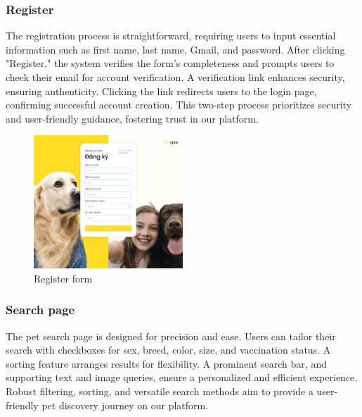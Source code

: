 \subsubsection{Register}

The registration process is straightforward, requiring users to input essential information such as first name, last name, Gmail, and password. After clicking "Register," the system verifies the form's completeness and prompts users to check their email for account verification. A verification link enhances security, ensuring authenticity. Clicking the link redirects users to the login page, confirming successful account creation. This two-step process prioritizes security and user-friendly guidance, fostering trust in our platform.

\begin{figure}[H]
    \centering
    \includegraphics[width=0.5\textwidth]{Figures/UI/register_ui.png}
    \caption{Register form}
\end{figure}

\subsubsection{Search page}

The pet search page is designed for precision and ease. Users can tailor their search 
with checkboxes for sex, breed, color, size, and vaccination status. A sorting feature 
arranges results for flexibility. A prominent search bar, and supporting text and image
 queries, ensure a personalized and efficient experience. Robust filtering, sorting, and 
 versatile search methods aim to provide a user-friendly pet discovery journey on our platform.

